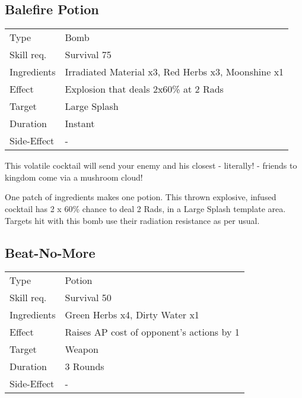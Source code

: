 \documentclass[11pt,a4paper,twocolumn]{book}
\begin{document}
\subsection*{Balefire Potion}
{
	\begin{tabu} to 75mm{| X[l,4] | X[l,8] |}
		\hline
		Type 			& Bomb 														\\
		Skill req.	    & Survival 75 												\\
		Ingredients     & Irradiated Material x3, Red Herbs x3, Moonshine x1		\\
		Effect     		& Explosion that deals 2x60\% at 2 Rads 					\\
		Target      	& Large Splash												\\
		Duration  		& Instant	 												\\
		Side-Effect     & -															\\ \hline
	\end{tabu}
	
}

\medskip

This volatile cocktail will send your enemy and his closest - literally! - friends to kingdom come via a mushroom cloud!

One patch of ingredients makes one potion.
This thrown explosive, infused cocktail has 2 x 60\% chance to deal 2 Rads, in a Large Splash template area. Targets hit with this bomb use their radiation resistance as per usual.

\vfill

\subsection*{Beat-No-More}
{
	\begin{tabu} to 75mm{| X[l,4] | X[l,8] |}
		\hline
		Type 			& Potion 													\\
		Skill req.	    & Survival 50 												\\
		Ingredients     & Green Herbs x4, Dirty Water x1							\\
		Effect     		& Raises AP cost of opponent's actions by 1 				\\
		Target      	& Weapon													\\
		Duration  		& 3 Rounds	 												\\
		Side-Effect     & -															\\ \hline
	\end{tabu}
	
}
\end{document}
